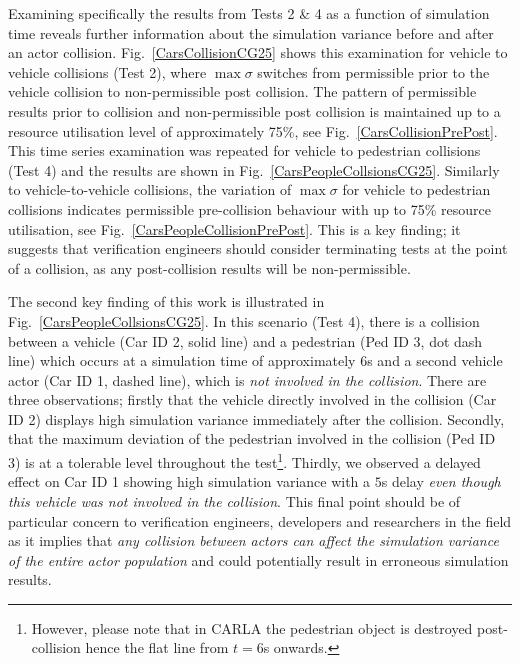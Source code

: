 Examining specifically the results from Tests 2 \& 4 as a function of simulation time reveals further information about the simulation variance before and after an actor collision. Fig.~\ref{CarsCollisionCG25} shows this examination for vehicle to vehicle collisions (Test 2), where $\max\sigma$ switches from permissible prior to the vehicle collision to non-permissible post collision. 
%
The pattern of permissible results prior to collision and non-permissible post collision is maintained up to a resource utilisation level of approximately 75\%, see Fig.~\ref{CarsCollisionPrePost}. This time series examination was repeated for vehicle to pedestrian collisions (Test 4) and the results are shown in Fig.~\ref{CarsPeopleCollsionsCG25}. Similarly to vehicle-to-vehicle collisions, the variation of $\max\sigma$ for vehicle to pedestrian collisions indicates permissible pre-collision behaviour with up to 75\% resource utilisation, see Fig.~\ref{CarsPeopleCollisionPrePost}. This is a key finding; it suggests that verification engineers should consider terminating tests at the point of a collision, as any post-collision results will be non-permissible.

The second key finding of this work is illustrated in Fig.~\ref{CarsPeopleCollsionsCG25}. In this scenario (Test 4), there is a collision between a vehicle (Car ID 2, solid line) and a pedestrian (Ped ID 3, dot dash line) which occurs at a simulation time of approximately $6$s and a second vehicle actor (Car ID 1, dashed line), which is \textit{not involved in the collision}. There are three observations; firstly that the vehicle directly involved in the collision (Car ID 2) displays high simulation variance immediately after the collision. Secondly, that the maximum deviation of the pedestrian involved in the collision (Ped ID 3) is at a tolerable level throughout the test\footnote{However, please note that in CARLA the pedestrian object is destroyed post-collision hence the flat line from $t=6$s onwards.}. Thirdly, we observed a delayed effect on Car ID 1 showing high simulation variance with a $5$s delay \textit{even though this vehicle was not involved in the collision}. This final point should be of particular concern to verification engineers, developers and researchers in the field as it implies that \textit{any collision between actors can affect the simulation variance of the entire actor population} and could potentially result in  erroneous simulation results. %

